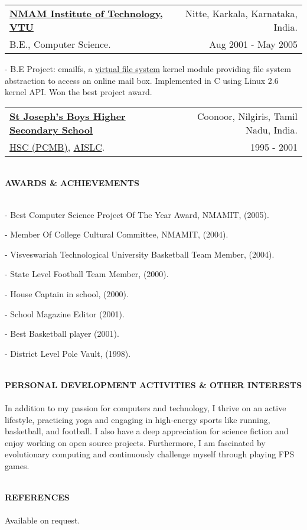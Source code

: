 \documentclass[12pt]{article}
\makeatletter
\newcommand{\lineunder}{\vspace*{-10pt} \\ \hspace*{-18pt} \hrulefill \vspace{2pt}\\}
\newcommand{\header}[1]{{\hspace*{-15pt}\vspace*{-0pt}\\ \uppercase{\textbf {#1}}}  \lineunder}
\newcommand{\employer}[4]{ 
        \vspace*{6pt}
	\begin{tabular*}{\textwidth}{l@{\extracolsep{\fill}}r}
	\textbf{#1} & #2 \\
                #3  & #4 \\ 
	\end{tabular*}
}
\newenvironment{achievements}{
        \vspace{-0pt}
        \begin{list}
        {}
        {\topsep 0pt \itemsep -3pt}
}
{
        \end{list}
}
\makeatother
\begin{document}
\vspace{5pt}
\employer{\href{http://www.nitte.ac.in/nmamit/}{NMAM Institute of Technology, VTU }} { Nitte, Karkala, Karnataka, India. }
{B.E., Computer  Science. }{Aug 2001 - May 2005 }
	\begin{achievements}
		\item[-] B.E Project: emailfs, a \href{http://en.wikipedia.org/wiki/Virtual_file_system}{virtual file system} kernel module providing file system abstraction to access an online mail box. Implemented in C using Linux 2.6 kernel API. Won the best project award.
	\end{achievements}

\vspace{5pt}
\employer{\href{http://www.stjosephscoonoor.com}{St Joseph's Boys Higher Secondary School}} { Coonoor, Nilgiris, Tamil Nadu, India.}
{\href{http://en.wikipedia.org/wiki/Higher_Secondary_(School)_Certificate}{HSC (PCMB)}, \href{http://www.google.com/search?q=anglo+indian+school+leaving+certificate}{AISLC}. }{ 1995 - 2001  }

\header{Awards \& Achievements} 
\begin{achievements}
    \item[-] Best Computer Science Project Of The Year Award, NMAMIT, (2005). \\
    \item[-] Member Of College Cultural Committee, NMAMIT, (2004). \\
    \item[-] Visveswariah Technological University Basketball Team Member, (2004).\\
    \item[-] State Level Football Team Member, (2000).\\
    \item[-] House Captain in school, (2000).\\
    \item[-] School Magazine Editor (2001).\\
    \item[-] Best Basketball player (2001). \\
    \item[-] District Level Pole Vault, (1998).\\
\end{achievements}

\header{Personal Development Activities \& Other Interests} 
In addition to my passion for computers and technology, I thrive on an active lifestyle, practicing yoga and engaging in high-energy sports like running, basketball, and football. I also have a deep appreciation for science fiction and enjoy working on open source projects. Furthermore, I am fascinated by evolutionary computing and continuously challenge myself through playing FPS games.

\header{References}
  Available on request.
\thispagestyle{empty}
\end{document}
